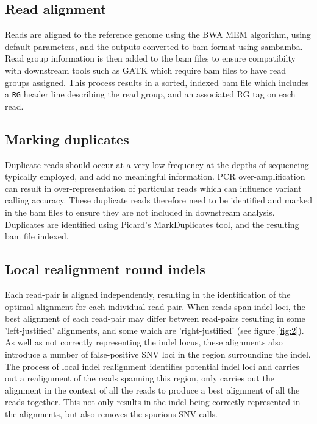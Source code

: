 \documentclass[a4paper,10pt,twoside]{article}
\begin{document}
\subsection{Read alignment}

Reads are aligned to the reference genome using the BWA MEM algorithm, using
default parameters, and the outputs converted to bam format using sambamba.
Read group information is then added to the bam files to ensure compatibilty
with downstream tools such as GATK which require bam files to have read groups
assigned. This process results in a sorted, indexed bam file which includes a
{\tt RG} header line describing the read group, and an associated RG tag on
each read.

\subsection{Marking duplicates}

Duplicate reads should occur at a very low frequency at the depths of
sequencing typically employed, and add no meaningful information. PCR
over-amplification can result in over-representation of particular reads which
can influence variant calling accuracy. These duplicate reads therefore need to
be identified and marked in the bam files to ensure they are not included in
downstream analysis.  Duplicates are identified using Picard's MarkDuplicates
tool, and the resulting bam file indexed.

\subsection{Local realignment round indels}

Each read-pair is aligned independently, resulting in the identification of the
optimal alignment for each individual read pair. When reads span indel loci,
the best alignment of each read-pair may differ between read-pairs resulting in
some 'left-justified' alignments, and some which are 'right-justified' (see
figure \ref{fig:2}). As well as not correctly representing the indel locus,
these alignments also introduce a number of false-positive SNV loci in the
region surrounding the indel. The process of local indel realignment identifies
potential indel loci and carries out a realignment of the reads spanning this
region, only carries out the alignment in the context of all the reads to
produce a best alignment of all the reads together. This not only results in
the indel being correctly represented in the alignments, but also removes the
spurious SNV calls.
\end{document}
